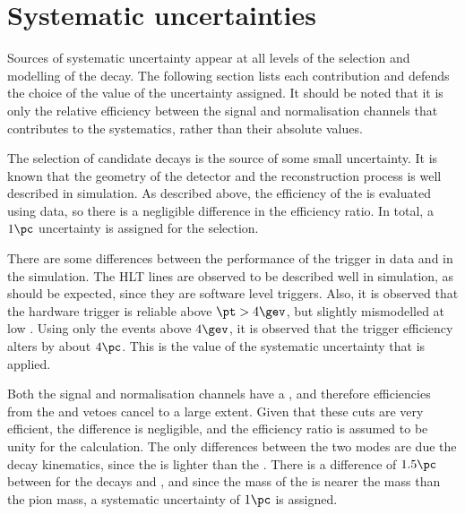 \section{Systematic uncertainties}
\label{sec:dsphi:syst}

Sources of systematic uncertainty appear at all levels of the selection and modelling of the decay.
The following section lists each contribution and defends the choice of the value of the
uncertainty assigned.
It should be noted that it is only the relative efficiency between the signal and normalisation
channels that contributes to the systematics, rather than their absolute values.

The selection of candidate \btodsphi decays is the source of some small uncertainty.
It is known that the geometry of the detector and the reconstruction process is well described in
simulation.
As described above, the efficiency of the \bdt is evaluated using data, so there is a negligible
difference in the efficiency ratio.
In total, a $1\pc$ uncertainty is assigned for the selection.

There are some differences between the performance of the trigger in data and in the simulation.
The HLT lines are observed to be described well in simulation, as should be expected, since they
are software level triggers.
Also, it is observed that the \lone hardware trigger is reliable above $\pt>4\gev$, but slightly
mismodelled at low \pt.
Using only the events above $4\gev$, it is observed that the trigger efficiency alters by about
$4\pc$.
This is the value of the systematic uncertainty that is applied.

Both the signal and normalisation channels have a \dstokkpi, and therefore efficiencies from the \Dp and
\Lc vetoes cancel to a large extent.
Given that these cuts are very efficient, the difference is negligible, and the efficiency ratio is
assumed to be unity for the calculation.
The only differences between the two modes are due the decay kinematics, since the \phii is lighter
than the \Dz.
There is a difference of $1.5\pc$ between  for the decays \decay{\Bsb}{\Dsp\pim} and
\btodsd, and
since the mass of the \phii is nearer the \Dz mass than the pion mass, a systematic uncertainty of
$1\pc$ is assigned.


